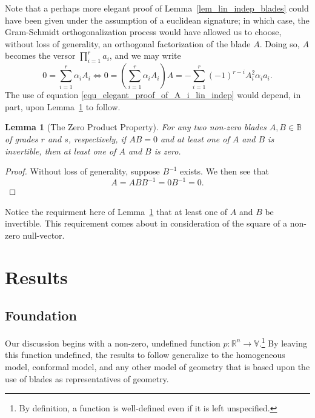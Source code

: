 \documentclass{birkjour}
\newtheorem{lem}[thm]{Lemma}
\theoremstyle{definition}
\theoremstyle{remark}
\numberwithin{equation}{section}
\newcommand{\R}{\mathbb{R}}
\newcommand{\B}{\mathbb{B}}
\newcommand{\V}{\mathbb{V}}
\begin{document}
Note that a perhaps more elegant proof of Lemma~\ref{lem_lin_indep_blades} could have been given
under the assumption
of a euclidean signature; in which case, the Gram-Schmidt orthogonalization process would have
allowed us to choose, without loss of generality, an orthogonal factorization of the blade $A$.
Doing so, $A$ becomes the versor $\prod_{i=1}^r a_i$, and we may write
\begin{equation}\label{equ_elegant_proof_of_A_i_lin_indep}
0 = \sum_{i=1}^r \alpha_iA_i \iff
0=\left(\sum_{i=1}^r\alpha_iA_i\right)A = -\sum_{i=1}^r(-1)^{r-i}A_i^2\alpha_ia_i.
\end{equation}
The use of equation \eqref{equ_elegant_proof_of_A_i_lin_indep} would depend, in part, upon Lemma~\ref{lem_zero_prod_property} to follow.

\begin{lem}[The Zero Product Property]\label{lem_zero_prod_property}
For any two non-zero blades $A,B\in\B$ of grades $r$ and $s$, respectively, if $AB=0$ and at least one of $A$ and $B$
is invertible, then at least one of $A$ and $B$ is zero.
\end{lem}
\begin{proof}
Without loss of generality, suppose $B^{-1}$ exists.  We then see that
\begin{equation}
A=ABB^{-1}=0B^{-1}=0.
\end{equation}
\end{proof}

Notice the requirment here of Lemma~\ref{lem_zero_prod_property} that at least one of $A$ and $B$ be invertible.
This requirement comes about in consideration of the square of a non-zero null-vector.

\section{Results}

\subsection{Foundation}

Our discussion begins with a non-zero, undefined function $p:\R^n\to\V$.\footnote{By definition, a function is well-defined even if it is left unspecified.}
By leaving this function undefined, the results to follow generalize to the homogeneous model, conformal model,
and any other model of geometry that is based upon the use of blades as representatives of geometry.
\end{document}
